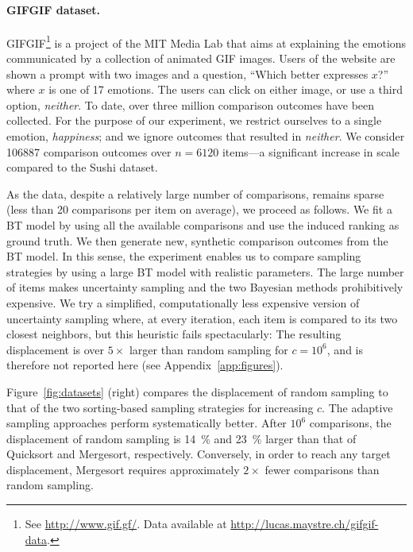 \paragraph{GIFGIF dataset.}

GIFGIF\footnote{See \url{http://www.gif.gf/}.
Data available at \url{http://lucas.maystre.ch/gifgif-data}.} is a project of the MIT Media Lab that aims at explaining the emotions communicated by a collection of animated GIF images.
Users of the website are shown a prompt with two images and a question, ``Which better expresses $x$?'' where $x$ is one of 17 emotions.
The users can click on either image, or use a third option, \emph{neither}.
To date, over three million comparison outcomes have been collected.
For the purpose of our experiment, we restrict ourselves to a single emotion, \emph{happiness}; and we ignore outcomes that resulted in \emph{neither}.
We consider \num{106887} comparison outcomes over $n = \num{6120}$ items---a significant increase in scale compared to the Sushi dataset.

As the data, despite a relatively large number of comparisons, remains sparse (less than 20 comparisons per item on average), we proceed as follows.
We fit a BT model by using all the available comparisons and use the induced ranking as ground truth.
We then generate new, synthetic comparison outcomes from the BT model.
In this sense, the experiment enables us to compare sampling strategies by using a large BT model with realistic parameters.
The large number of items makes uncertainty sampling and the two Bayesian methods prohibitively expensive.
We try a simplified, computationally less expensive version of uncertainty sampling where, at every iteration, each item is compared to its two closest neighbors, but this heuristic fails spectacularly: The resulting displacement is over $5\times$ larger than random sampling for $c = 10^6$, and is therefore not reported here (see Appendix~\ref{app:figures}).

Figure~\ref{fig:datasets} (right) compares the displacement of random sampling to that of the two sorting-based sampling strategies for increasing $c$.
The adaptive sampling approaches perform systematically better.
After $10^6$ comparisons, the displacement of random sampling is \num{14}~\% and \num{23}~\% larger than that of Quicksort and Mergesort, respectively.
Conversely, in order to reach any target displacement, Mergesort requires approximately $2 \times$ fewer comparisons than random sampling.

